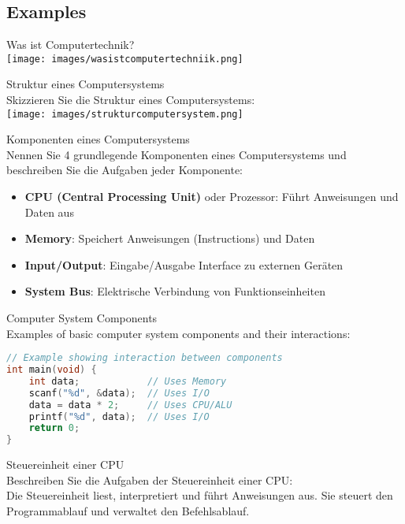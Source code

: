 \subsection{Examples}

\begin{example2}{Was ist Computertechnik?}\\
  \texttt{[image: images/wasistcomputertechniik.png]}
\end{example2}

\begin{example2}{Struktur eines Computersystems}\\
Skizzieren Sie die Struktur eines Computersystems:\\
\texttt{[image: images/strukturcomputersystem.png]}
\end{example2}

\begin{example2}{Komponenten eines Computersystems}\\
Nennen Sie 4 grundlegende Komponenten eines Computersystems und beschreiben Sie die Aufgaben jeder Komponente:
\begin{itemize}
  \item \textbf{CPU (Central Processing Unit)} oder Prozessor: Führt Anweisungen und Daten aus
  \item \textbf{Memory}: Speichert Anweisungen (Instructions) und Daten
  \item \textbf{Input/Output}: Eingabe/Ausgabe Interface zu externen Geräten
  \item \textbf{System Bus}: Elektrische Verbindung von Funktionseinheiten
\end{itemize}
\end{example2}



\begin{example2}{Computer System Components}\\
Examples of basic computer system components and their interactions:

\begin{lstlisting}[language=C, style=basesmol]
// Example showing interaction between components
int main(void) {
    int data;            // Uses Memory
    scanf("%d", &data);  // Uses I/O
    data = data * 2;     // Uses CPU/ALU
    printf("%d", data);  // Uses I/O
    return 0;
}
\end{lstlisting}
\end{example2}

\begin{example2}{Steuereinheit einer CPU}\\
Beschreiben Sie die Aufgaben der Steuereinheit einer CPU:\\
Die Steuereinheit liest, interpretiert und führt Anweisungen aus. Sie steuert den Programmablauf und verwaltet den Befehlsablauf.
\end{example2}

